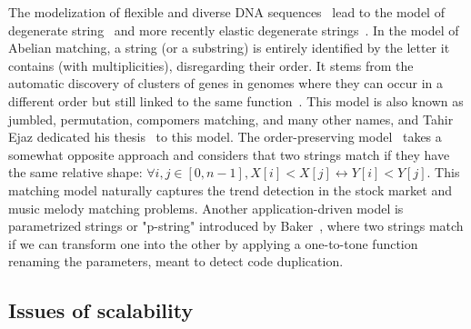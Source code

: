 The modelization of flexible and diverse DNA sequences~\cite{comm1970iupac} lead to the model of degenerate string~\cite{abrahamson1987generalized} and more recently elastic degenerate strings~\cite{iliopoulos2021efficient}.
In the model of Abelian matching, a string (or a substring) is entirely identified by the letter it contains (with multiplicities), disregarding their order. It stems from the automatic discovery of clusters of genes in genomes where they can occur in a different order but still linked to the same function~\cite{eres2004permutation}. This model is also known as jumbled, permutation, compomers matching, and many other names, and Tahir Ejaz dedicated his thesis~\cite{ejaz2010abelian} to this model.
The order-preserving model~\cite{kim2014order,kubica2013linear} takes a somewhat opposite approach and considers that two strings match if they have the same relative shape: $\forall i,j \in [0,n-1], X[i] < X[j] \leftrightarrow Y[i] < Y[j]$. This matching model naturally captures the trend detection in the stock market and music melody matching problems.
%
Another application-driven model is parametrized strings or "p-string" introduced by Baker~\cite{baker1993theory}, where two strings match if we can transform one into the other by applying a one-to-tone function renaming the parameters, meant to detect code duplication.\\

\subsection{Issues of scalability}



